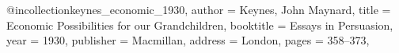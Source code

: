 
@incollection{keynes_economic_1930,
  author    = {Keynes, John Maynard},
  title     = {Economic Possibilities for our Grandchildren},
  booktitle = {Essays in Persuasion},
  year      = {1930},
  publisher = {Macmillan},
  address   = {London},
  pages     = {358--373},
}

